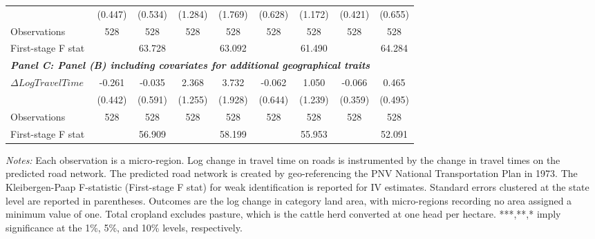 \begin{table}[p]
{{\begin{tabular}{l*{8}{c}}
&     (0.447)         &     (0.534)         &     (1.284)         &     (1.769)         &     (0.628)         &     (1.172)         &     (0.421)         &     (0.655)         \\
Observations        &         528         &         528         &         528         &         528         &         528         &         528         &         528         &         528         \\
First-stage F stat  &                     &      63.728         &                     &      63.092         &                     &      61.490         &                     &      64.284         \\
\hline
\multicolumn{8}{l}{\linebreak \textbf{\textit{Panel C: Panel (B) including covariates for additional geographical traits}}} \\
$\Delta Log Travel Time$&      -0.261         &      -0.035         &       2.368\sym{*}  &       3.732\sym{*}  &      -0.062         &       1.050         &      -0.066         &       0.465         \\
&     (0.442)         &     (0.591)         &     (1.255)         &     (1.928)         &     (0.644)         &     (1.239)         &     (0.359)         &     (0.495)         \\
Observations        &         528         &         528         &         528         &         528         &         528         &         528         &         528         &         528         \\
First-stage F stat  &                     &      56.909         &                     &      58.199         &                     &      55.953         &                     &      52.091         \\
\hline\hline
\end{tabular}}
}
\usebox{\tabbox}
\begin{minipage}{\wd\tabbox}
    \vspace{0.1cm}
    {\footnotesize \sloppy \textit{Notes: } Each observation is a micro-region. Log change in travel time on roads is instrumented by the change in travel times on the predicted road network. The predicted road network is created by geo-referencing the PNV National Transportation Plan in 1973. The Kleibergen-Paap F-statistic (First-stage F stat) for weak identification is reported for IV estimates. Standard errors clustered at the state level are reported in parentheses. Outcomes are the log change in category land area, with micro-regions recording no area assigned a minimum value of one. Total cropland excludes pasture, which is the cattle herd converted at one head per hectare. ***,**,* imply significance at the 1\%, 5\%, and 10\% levels, respectively.}
\end{minipage}
\endgroup
\end{table}
